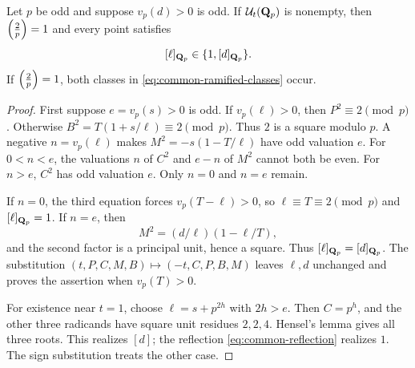\begin{lemma}\label{lem:common-ramified}
Let $p$ be odd and suppose $v_p(d)>0$ is odd.  If
$\mathcal U_t(\mathbf Q_p)$ is nonempty, then $\left(\frac{2}{p}\right)=1$ and every point satisfies
\begin{equation}\label{eq:common-ramified-classes}
 [\ell]_{\mathbf Q_p}\in\{1,[d]_{\mathbf Q_p}\}.
\end{equation}
If $\left(\frac{2}{p}\right)=1$, both classes in \eqref{eq:common-ramified-classes}
occur.
\end{lemma}
\begin{proof}
First suppose $e=v_p(s)>0$ is odd.  If $v_p(\ell)>0$, then
$P^2\equiv2\pmod p$.  Otherwise
$B^2=T(1+s/\ell)\equiv2\pmod p$.  Thus $2$ is a square modulo $p$.
A negative $n=v_p(\ell)$ makes $M^2=-s(1-T/\ell)$ have odd valuation $e$.
For $0<n<e$, the valuations $n$ of $C^2$ and $e-n$ of $M^2$
cannot both be even.  For $n>e$, $C^2$ has odd valuation $e$.
Only $n=0$ and $n=e$ remain.

If $n=0$, the third equation forces $v_p(T-\ell)>0$, so
$\ell\equiv T\equiv2\pmod p$ and $[\ell]_{\mathbf Q_p}=1$.
If $n=e$, then
\[
 M^2=(d/\ell)(1-\ell/T),
\]
and the second factor is a principal unit, hence a square.
Thus $[\ell]_{\mathbf Q_p}=[d]_{\mathbf Q_p}$.
The substitution
$(t,P,C,M,B)\mapsto(-t,C,P,B,M)$ leaves $\ell,d$ unchanged and proves
the assertion when $v_p(T)>0$.

For existence near $t=1$, choose $\ell=s+p^{2h}$ with $2h>e$.
Then $C=p^h$, and the other three radicands have square unit residues
$2,2,4$.  Hensel's lemma gives all three roots.  This realizes $[d]$;
the reflection \eqref{eq:common-reflection} realizes $1$.
The sign substitution treats the other case.
\end{proof}


